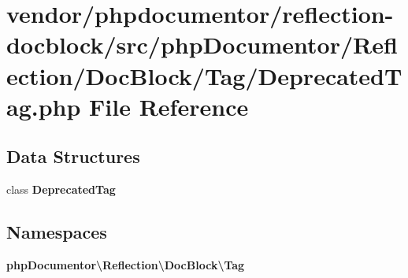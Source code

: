 \section{vendor/phpdocumentor/reflection-\/docblock/src/php\+Documentor/\+Reflection/\+Doc\+Block/\+Tag/\+Deprecated\+Tag.php File Reference}
\label{_deprecated_tag_8php}
\subsection*{Data Structures}
\begin{DoxyCompactItemize}
\item 
class {\bf Deprecated\+Tag}
\end{DoxyCompactItemize}
\subsection*{Namespaces}
\begin{DoxyCompactItemize}
\item 
 {\bf php\+Documentor\textbackslash{}\+Reflection\textbackslash{}\+Doc\+Block\textbackslash{}\+Tag}
\end{DoxyCompactItemize}
